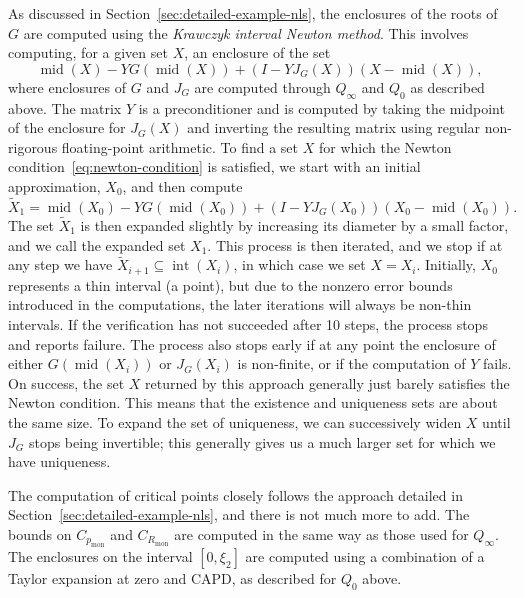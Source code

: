 \documentclass[11pt]{article}
\DeclareMathOperator{\midint}{mid}
\newcommand{\codenumber}[1]{#1} %
\begin{document}
As discussed in Section~\ref{sec:detailed-example-nls}, the enclosures
of the roots of \(G\) are computed using the \emph{Krawczyk interval
  Newton method}. This involves computing, for a given set \(X\), an
enclosure of the set
\begin{equation*}
  \midint(X) - YG(\midint(X)) + (I - YJ_{G}(X))(X - \midint(X)),
\end{equation*}
where enclosures of \(G\) and \(J_{G}\) are computed through
\(Q_{\infty}\) and \(Q_{0}\) as described above. The matrix \(Y\) is a
preconditioner and is computed by taking the midpoint of the
enclosure for \(J_{G}(X)\) and inverting the resulting matrix using
regular non-rigorous floating-point arithmetic. To find a set \(X\)
for which the Newton condition~\eqref{eq:newton-condition} is
satisfied, we start with an initial approximation, \(X_{0}\), and then
compute
\begin{equation*}
  \tilde{X}_{1} = \midint(X_{0}) - YG(\midint(X_{0})) + (I - YJ_{G}(X_{0}))(X_{0} - \midint(X_{0})).
\end{equation*}
The set \(\tilde{X}_{1}\) is then expanded slightly by increasing its
diameter by a small factor, and we call the expanded set \(X_{1}\).
This process is then iterated, and we stop if at any step we have
\(\tilde{X}_{i + 1} \subseteq \operatorname{int}(X_{i})\), in which
case we set \(X = X_{i}\). Initially, \(X_{0}\) represents a thin
interval (a point), but due to the nonzero error bounds introduced in
the computations, the later iterations will always be non-thin
intervals. If the verification has not succeeded after
\codenumber{10} steps, the process stops and reports failure. The
process also stops early if at any point the enclosure of either
\(G(\midint(X_{i}))\) or \(J_{G}(X_{i})\) is non-finite, or if the
computation of \(Y\) fails. On success, the set \(X\) returned by this
approach generally just barely satisfies the Newton condition. This
means that the existence and uniqueness sets are about the same size.
To expand the set of uniqueness, we can successively widen \(X\) until
\(J_{G}\) stops being invertible; this generally gives us a much
larger set for which we have uniqueness.

The computation of critical points closely follows the approach
detailed in Section~\ref{sec:detailed-example-nls}, and there is not
much more to add. The bounds on \(C_{p_{\mathrm{mon}}}\) and
\(C_{R_{\mathrm{mon}}}\) are computed in the same way as those used
for \(Q_{\infty}\). The enclosures on the interval \([0, \xi_{2}]\)
are computed using a combination of a Taylor expansion at zero and
CAPD, as described for \(Q_{0}\) above.
\end{document}
